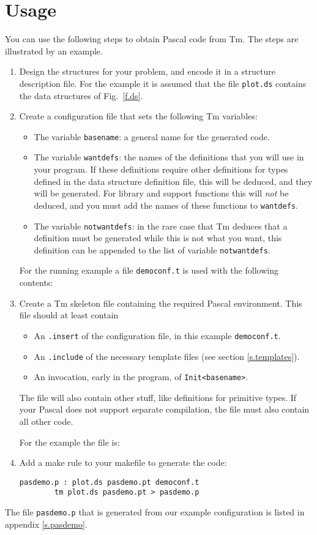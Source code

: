 \documentclass{article}
\newcommand{\Pascal}{\sf Pascal}
\newcommand{\Tm}{\sf Tm}
\newenvironment{listing}{\small\begin{flushleft}}{\end{flushleft}}
\begin{document}
\section{Usage}
\label{s.pasquickintro}
You can use the following steps to obtain {\Pascal} code from {\Tm}.
The steps are illustrated by an example.
\begin{enumerate}
\item
Design the structures for your problem,
and encode it in a structure description file.
For the example it is assumed that the file {\tt plot.ds} contains the
data structures of Fig.~\ref{f.ds}.
\item
Create a configuration file that sets the following {\Tm} variables:
\begin{itemize}
\item
The variable {\tt basename}:
a general name for the generated code.
\item
The variable {\tt wantdefs}: the names of the definitions that you
will use in your program.
If these definitions require other definitions for types defined in
the data structure definition file,
this will be deduced, and they will be generated.
For library and support functions this will {\em not} be deduced,
and you must add the names of these functions to {\tt wantdefs}.
\item
The variable {\tt notwantdefs}:
in the rare case that {\Tm} deduces that a definition must be generated
while this is not what you want,
this definition can be appended to the list of variable {\tt notwantdefs}.
\end{itemize}
For the running example a file {\tt democonf.t} is used with the
following contents:
\begin{listing}

\end{listing}
\item
Create a {\Tm} skeleton file containing the required {\Pascal} environment.
This file should at least contain
\begin{itemize}
\item
An {\tt .insert} of the configuration file, in this example
{\tt democonf.t}.
\item
An {\tt .include} of the necessary template files (see
section \ref{s.templates}).
\item
An invocation, early in the program, of {\tt Init<basename>}.
\end{itemize}
The file will also contain other stuff,
like definitions for primitive types.
If your {\Pascal} does not support separate compilation,
the file must also contain all other code.
\par
For the example the file is:
\begin{listing}

\end{listing}
\item
Add a make rule to your makefile to generate the code:
\begin{verbatim}
pasdemo.p : plot.ds pasdemo.pt democonf.t
        tm plot.ds pasdemo.pt > pasdemo.p
\end{verbatim}
\end{enumerate}
\par
The file {\tt pasdemo.p} that is generated from our
example configuration is listed in appendix \ref{s.pasdemo}.
\end{document}
